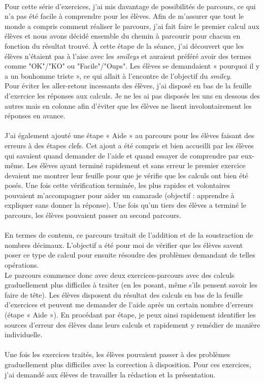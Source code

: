 \paragraph{}Pour cette série d'exercices, j'ai mis davantage de possibilités de parcours, ce qui n'a pas été facile à comprendre pour les élèves. Afin de m'assurer que tout le monde a compris comment réaliser le parcours, j'ai fait faire le premier calcul aux élèves et nous avons décidé ensemble du chemin à parcourir pour chacun en fonction du résultat trouvé. À cette étape de la séance, j'ai découvert que les élèves n'étaient pas à l'aise avec les \textit{smileys} et auraient préféré avoir des termes comme "OK"/"KO" ou "Facile"/"Oups". Les élèves se demandaient « pourquoi il y a un bonhomme triste », ce qui allait à l'encontre de l'objectif du \textit{smiley}.\\
Pour éviter les aller-retour incessants des élèves, j'ai disposé en bas de la feuille d'exercice les réponses aux calculs. Je ne les ai pas disposés les uns en dessous des autres mais en colonne afin d'éviter que les élèves ne lisent involontairement les réponses en avance.
\paragraph{}J'ai également ajouté une étape « Aide » au parcours pour les élèves faisant des erreurs à des étapes clefs. Cet ajout a été compris et bien accueilli par les élèves qui savaient quand demander de l'aide et quand essayer de comprendre par eux-même. Les élèves ayant terminé rapidement et sans erreur le premier exercice devaient me montrer leur feuille pour que je vérifie que les calculs ont bien été posés. Une fois cette vérification terminée, les plus rapides et volontaires pouvaient m'accompagner pour aider un camarade (objectif : apprendre à expliquer sans donner la réponse). Une fois qu'un tiers des élèves a terminé le parcours, les élèves pouvaient passer au second parcours.
\paragraph{} En termes de contenu, ce parcours traitait de l'addition et de la soustraction de nombres décimaux. L'objectif a été pour moi de vérifier que les élèves savent poser ce type de calcul pour ensuite résoudre des problèmes demandant de telles opérations.\\
Le parcours commence donc avec deux exercices-parcours avec des calculs graduellement plus difficiles à traiter (en les posant, même s'ils pensent savoir les faire de tête). Les élèves disposent du résultat des calculs en bas de la feuille d'exercices et peuvent me demander de l'aide après un certain nombre d'erreurs (étape « Aide »). En procédant par étape, je peux ainsi rapidement identifier les sources d'erreur des élèves dans leurs calculs et rapidement y remédier de manière individuelle.\\
\\
Une fois les exercices traités, les élèves pouvaient passer à des problèmes graduellement plus difficiles avec la correction à disposition. Pour ces exercices, j'ai demandé aux élèves de travailler la rédaction et la présentation.

